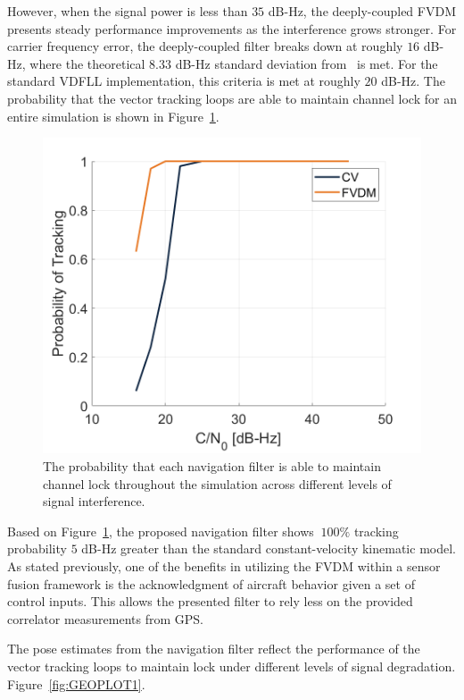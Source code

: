 However, when the signal power is less than \(35\) dB-Hz, the deeply-coupled FVDM presents steady performance improvements as the interference grows stronger. For carrier frequency error, the deeply-coupled filter breaks down at roughly \(16\) dB-Hz, where the theoretical \(8.33\) dB-Hz standard deviation from~\cite{lashleyPerformanceAnalysisVector2009} is met. For the standard VDFLL implementation, this criteria is met at roughly \(20\) dB-Hz. The probability that the vector tracking loops are able to maintain channel lock for an entire simulation is shown in Figure~\ref{fig:trackingprobability1}.

\begin{figure}[!ht]
    \centering
    \includegraphics[width=0.5\linewidth]{Figures/straight/trackingprobstraight.png}
    \caption{The probability that each navigation filter is able to maintain channel lock throughout the simulation across different levels of signal interference.}\label{fig:trackingprobability1}
\end{figure}

Based on Figure~\ref{fig:trackingprobability1}, the proposed navigation filter shows \(~100\% \) tracking probability \(5\) dB-Hz greater than the standard constant-velocity kinematic model. As stated previously, one of the benefits in utilizing the FVDM within a sensor fusion framework is the acknowledgment of aircraft behavior given a set of control inputs. This allows the presented filter to rely less on the provided correlator measurements from GPS\@.

The pose estimates from the navigation filter reflect the performance of the vector tracking loops to maintain lock under different levels of signal degradation. Figure~\ref{fig:GEOPLOT1}.


